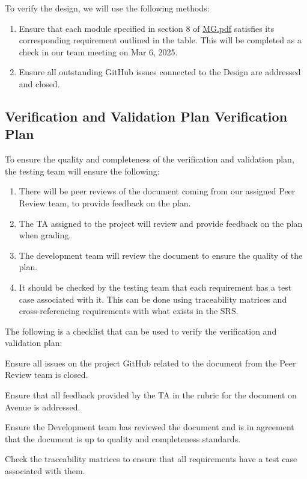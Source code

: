 \documentclass[12pt, titlepage]{article}
\begin{document}



To verify the design, we will use the following methods:
\begin{enumerate}
  \item Ensure that each module specified in section 8 of
    \href{https://github.com/Spitgranger/SyncMaster/blob/main/docs/Design/SoftArchitecture/MG.pdf}{MG.pdf}
    satisfies its corresponding requirement outlined in the table.
    This will be completed as a check in our team meeting on Mar 6, 2025.
  \item Ensure all outstanding GitHub issues connected to the Design
    are addressed and closed.
\end{enumerate}

\subsection{Verification and Validation Plan Verification Plan}

To ensure the quality and completeness of the verification and
validation plan, the testing team will ensure the following:

\begin{enumerate}
  \item There will be peer reviews of the document coming from our
    assigned Peer Review team, to provide feedback on the plan.
  \item The TA assigned to the project will review and provide
    feedback on the plan when grading.
  \item The development team will review the document to ensure the
    quality of the plan.
  \item It should be checked by the testing team that each
    requirement has a test case associated with it. This can be done
    using traceability matrices and cross-referencing requirements
    with what exists in the SRS.
\end{enumerate}

The following is a checklist that can be used to verify the
verification and validation plan:
\begin{todolist}
\item Ensure all issues on the project GitHub related to the document
  from the Peer Review team is closed.
\item Ensure that all feedback provided by the TA in the rubric for
  the document on Avenue is addressed.
\item Ensure the Development team has reviewed the document and is in
  agreement that the document is up to quality and completeness standards.
\item Check the traceability matrices to ensure that all requirements
  have a test case associated with them.
\end{todolist}
\end{document}
